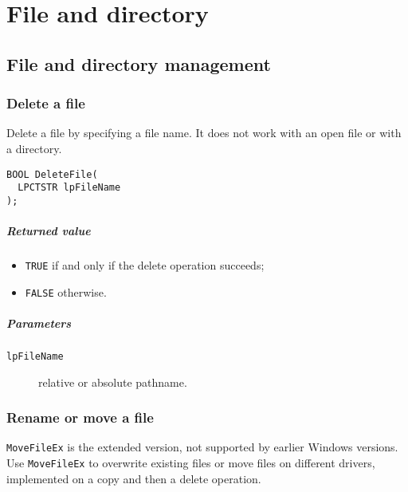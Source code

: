 \chapter{File and directory}
\section{File and directory management}
\subsection{Delete a file}
Delete a file by specifying a file name. It does not work with an open file or with a directory.

\begin{verbatim}
BOOL DeleteFile(
  LPCTSTR lpFileName
);
\end{verbatim}

\paragraph{Returned value}
\begin{itemize}
\item \texttt{TRUE} if and only if the delete operation succeeds;
\item \texttt{FALSE} otherwise.
\end{itemize}

\paragraph{Parameters}
\begin{description}
\item [\texttt{lpFileName}] relative or absolute pathname.
\end{description}

\subsection{Rename or move a file}
\texttt{MoveFileEx} is the extended version, not supported by earlier Windows versions. Use \texttt{MoveFileEx} to overwrite existing files or move files on different drivers, implemented on a copy and then a delete operation.

\begin{Parallel}{}{}
\end{Parallel}

